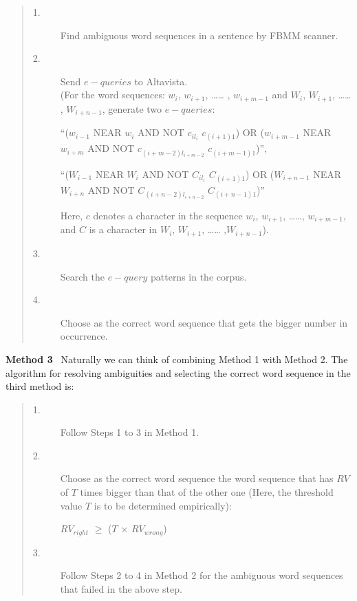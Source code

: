 \vspace{10pt}

\begin{quote}
\setlength{\baselineskip}{13pt}


\begin{description}
\item [1.]	Find ambiguous word sequences in a sentence by FBMM scanner.

\item [2.]	Send ${e-queries}$ to Altavista.\\ 

           (For the word sequences: $w_{i}$, $w_{i+1}$, …… , $w_{i+m-1}$ and $W_{i}$, $W_{i+1}$, …… , $W_{i+n-1}$, generate two ${e-queries}$:

             ``($w_{i-1}$ NEAR $w_{i}$ AND NOT $c_{il_{i}}$ $c_{(i+1)1}$) OR ($w_{i+m-1}$ NEAR $w_{i+m}$ AND NOT $c_{(i+m-2)l_{i+m-2}}$ $c_{(i+m-1)1}$)'',  

             ``($W_{i-1}$ NEAR $W_{i}$ AND NOT $C_{il_{i}}$ $C_{(i+1)1}$) OR ($W_{i+n-1}$ NEAR $W_{i+n}$ AND NOT $C_{(i+n-2)l_{i+n-2}}$ $C_{(i+n-1)1}$)''

           Here, $c$ denotes a character in the sequence $w_{i}$, $w_{i+1}$, ……, $w_{i+m-1}$, and $C$ is a character in $W_{i}$, $W_{i+1}$, …… ,$W_{i+n-1}$).\\
   

\item [3.]	Search the ${e-query}$ patterns in the corpus.

\item [4.]	Choose as the correct word sequence that gets the bigger number in occurrence.  
\end{description}

\end{quote}

\vspace{10pt}

{\bf Method 3}~ Naturally we can think of combining Method 1 with Method 2.
The algorithm for resolving ambiguities and selecting the correct
word sequence in the third method is:

\vspace{10pt}

\begin{quote}
\setlength{\baselineskip}{13pt}


\begin{description}
\item [1.] Follow Steps 1 to 3 in Method 1.
\item [2.] Choose as the correct word sequence the word sequence that has $RV$ of $T$ times bigger than that of the other one (Here, the threshold value $T$ is to be determined empirically):
\begin{center}
	          ${RV}_{right}$ $\geq$ ($T$ ${\times}$ ${RV}_{wrong}$)
\end{center}

\item [3.]	Follow Steps 2 to 4 in Method 2 for the ambiguous word sequences that failed in the above step.
\end{description}
\end{quote}
